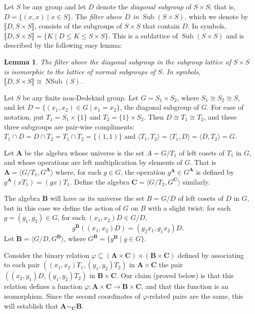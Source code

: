\documentclass{au}
\theoremstyle{plain}
\newtheorem{lemma}{Lemma}
\theoremstyle{definition}
\newcounter{claim}
\theoremstyle{remark}
\newcommand{\<}{\ensuremath{\langle}}
\renewcommand{\>}{\ensuremath{\rangle}}
\renewcommand{\phi}{\ensuremath{\varphi}}
\newcommand{\lb}{\ensuremath{\llbracket}}
\newcommand{\rb}{\ensuremath{\rrbracket}}
\newcommand{\bA}{\ensuremath{\mathbf{A}}}
\newcommand{\bB}{\ensuremath{\mathbf{B}}}
\newcommand{\bC}{\ensuremath{\mathbf{C}}}
\renewcommand{\leq}{\ensuremath{\leqslant}}
\newcommand{\Sub}{\ensuremath{\operatorname{Sub}}}
\newcommand{\NSub}{\ensuremath{\operatorname{NSub}}}
\renewcommand{\phi}{\ensuremath{\varphi}}
\begin{document}
Let $S$ be any group and let $D$ denote the \emph{diagonal subgroup} of 
$S\times S$; that is, $D = \{(x,x) \mid x\in S\}$.
The \emph{filter above $D$ in} $\Sub(S\times S)$, which we denote by
$\lb D, S\times S\rb$, %
consists of the subgroups of $S\times S$ that contain $D$.  In symbols,
$\lb D, S\times S\rb = \{K \mid D \leq K \leq S\times S\}$.  
This is a sublattice of $\Sub(S\times S)$ and is described by the following easy lemma:
\begin{lemma}
\label{lem:1}
  The filter above the diagonal subgroup in the subgroup lattice of $S\times S$
  is isomorphic to the lattice of normal subgroups of $S$. In symbols, 
$\lb D, S\times S\rb \cong \NSub(S)$.
\end{lemma}

Let $S$ be any finite non-Dedekind group. Let $G = S_1 \times S_2$, where
$S_1 \cong S_2 \cong S$, and let $D = \{(x_1,x_2)\in G \mid x_1 = x_2\}$,  the
diagonal subgroup of $G$. For ease of notation, put $T_1 = S_1 \times \{1\}$ and $T_2 = \{1\}\times S_2$.
Then $D \cong T_1 \cong T_2$, and these three 
subgroups are pair-wise compliments: $T_1\cap D = D\cap T_2 = T_1 \cap T_2 =
\{(1,1)\}$ and $ \<T_1, T_2\> = \<T_1,D\> = \<D, T_2\> = G$.

Let $\bA$ be the algebra whose universe is the set $A = G/T_1$ of left
cosets of $T_1$ in $G$, and whose operations are left multiplication by elements
of $G$. 
That is $\bA = \< G/T_1, G^{\bA}\>$ 
where, for each $g\in G$, the operation $g^{\bA} \in G^{\bA}$ is defined by
$g^{\bA}(xT_1) = (gx)T_1$.
Define the algebra $\bC = \< G/T_2, G^{\bC}\>$ similarly.  

The algebra $\bB$
will have as its universe the set $B = G/D$ of left cosets of $D$ in $G$, but in
this case we define the action of $G$ on $B$ with a slight twist:  for
each $g = (g_1, g_2) \in G$,
for each $(x_1, x_2)D \in G/D$,
\[
g^{\bB}((x_1,x_2)D) =  (g_2x_1, g_1 x_2)D.
\]
Let $\bB = \< G/D, G^{\bB}\>$, where $G^{\bB} =  \{g^{\bB} \mid g\in G\}$.

Consider the binary relation 
$\phi \subseteq (\bA \times \bC) \times (\bB \times \bC)$ defined by associating
to each pair $((x_1,x_2)T_1, (y_1,y_2)T_2)$ in $\bA \times \bC$
 the pair $((x_2, y_1)D, (y_1,y_2)T_2)$ in $\bB \times \bC$.
Our claim (proved below) is that this relation defines a function 
$\phi \colon \bA \times \bC \rightarrow \bB \times \bC$, 
and that this function is an isomorphism. Since the second coordinates of
$\phi$-related pairs are the same, this will establish that $\bA\sim_{\bC}\bB$. 
\end{document}
